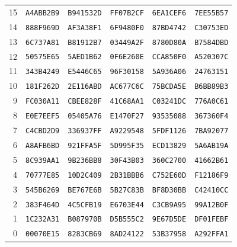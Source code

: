 \begin{longtable}{rlllll}
15 & \texttt{A4ABB2B9} & \texttt{B941532D} & \texttt{FF07B2CF} & \texttt{6EA1CEF6} & \texttt{7EE55B57}\\
14 & \texttt{888F969D} & \texttt{AF3A38F1} & \texttt{6F9480F0} & \texttt{87BD4742} & \texttt{C30753ED}\\
13 & \texttt{6C737A81} & \texttt{B81912B7} & \texttt{03449A2F} & \texttt{8780D80A} & \texttt{B7584DBD}\\
12 & \texttt{50575E65} & \texttt{5AED1B62} & \texttt{0F6E260E} & \texttt{CCA850F0} & \texttt{A520307C}\\
11 & \texttt{343B4249} & \texttt{E5446C65} & \texttt{96F30158} & \texttt{5A936A06} & \texttt{24763151}\\
10 & \texttt{181F262D} & \texttt{2E116ABD} & \texttt{AC677C6C} & \texttt{75BCDA5E} & \texttt{B6BB89B3}\\
9 & \texttt{FC030A11} & \texttt{CBEE828F} & \texttt{41C68AA1} & \texttt{C03241DC} & \texttt{776A0C61}\\
8 & \texttt{E0E7EEF5} & \texttt{05405A76} & \texttt{E1470F27} & \texttt{93535088} & \texttt{367360F4}\\
7 & \texttt{C4CBD2D9} & \texttt{336937FF} & \texttt{A9229548} & \texttt{5FDF1126} & \texttt{7BA92077}\\
6 & \texttt{A8AFB6BD} & \texttt{921FFA5F} & \texttt{5D995F35} & \texttt{ECD13829} & \texttt{5A6AB19A}\\
5 & \texttt{8C939AA1} & \texttt{9B236BB8} & \texttt{30F43B03} & \texttt{360C2700} & \texttt{41662B61}\\
4 & \texttt{70777E85} & \texttt{10D2C409} & \texttt{2B31BBB6} & \texttt{C752E60D} & \texttt{F12186F9}\\
3 & \texttt{545B6269} & \texttt{BE767E6B} & \texttt{5B27C83B} & \texttt{BF8D30BB} & \texttt{C42410CC}\\
2 & \texttt{383F464D} & \texttt{4C5CFB19} & \texttt{E6703E44} & \texttt{C3CB9A95} & \texttt{99A12B0F}\\
1 & \texttt{1C232A31} & \texttt{B087970B} & \texttt{D5B555C2} & \texttt{9E67D5DE} & \texttt{DF01FEBF}\\
0 & \texttt{00070E15} & \texttt{8283CB69} & \texttt{8AD24122} & \texttt{53B37958} & \texttt{A292FFA1}\\
\bottomrule
\end{longtable}
\endgroup

